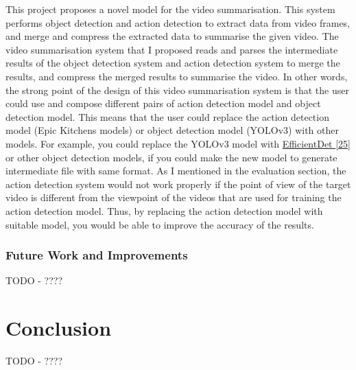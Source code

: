 \documentclass{article}
\begin{document}
This project proposes a novel model for the video summarisation. This system performs object detection and action detection to extract data from video frames, and merge and compress the extracted data to summarise the given video. The video summarisation system that I proposed reads and parses the intermediate results of the object detection system and action detection system to merge the results, and compress the merged results to summarise the video. In other words, the strong point of the design of this video summarisation system is that the user could use and compose different pairs of action detection model and object detection model. This means that the user could replace the action detection model (Epic Kitchens models) or object detection model (YOLOv3) with other models. For example, you could replace the YOLOv3 model with \hyperlink{ref8}{EfficientDet [25]} or other object detection models, if you could make the new model to generate intermediate file with same format. As I mentioned in the evaluation section, the action detection system would not work properly if the point of view of the target video is different from the viewpoint of the videos that are used for training the action detection model. Thus, by replacing the action detection model with suitable model, you would be able to improve the accuracy of the results.

\subsubsection{Future Work and Improvements}

TODO - ????

\section{Conclusion}

TODO - ????

\newpage
\end{document}
